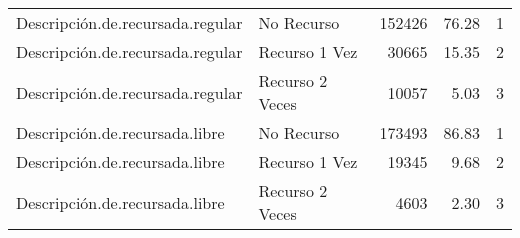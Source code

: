 \begin{table}[!h]
\begin{tabular}[t]{llrrr}
\addlinespace
\rowcolor{gray!6}  Descripción.de.recursada.regular & No Recurso & 152426 & 76.28 & 1\\
Descripción.de.recursada.regular & Recurso 1 Vez & 30665 & 15.35 & 2\\
\rowcolor{gray!6}  Descripción.de.recursada.regular & Recurso 2 Veces & 10057 & 5.03 & 3\\
Descripción.de.recursada.libre & No Recurso & 173493 & 86.83 & 1\\
\rowcolor{gray!6}  Descripción.de.recursada.libre & Recurso 1 Vez & 19345 & 9.68 & 2\\
\addlinespace
Descripción.de.recursada.libre & Recurso 2 Veces & 4603 & 2.30 & 3\\
\bottomrule
\end{tabular}
\end{table}

